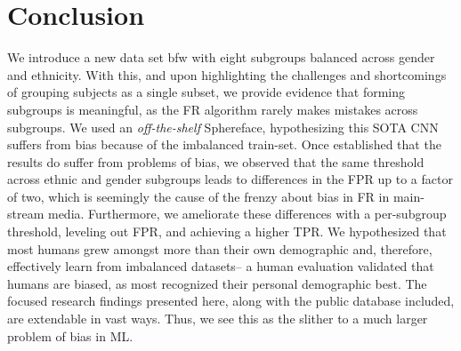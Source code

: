 \documentclass[10pt,twocolumn,letterpaper]{article}
\begin{document}
\section{Conclusion}
We introduce a new data set \gls{bfw} with eight subgroups balanced across gender and ethnicity. With this, and upon highlighting the challenges and shortcomings of grouping subjects as a single subset, we provide evidence that forming subgroups is meaningful, as the FR algorithm rarely makes mistakes across subgroups. We used an \textit{off-the-shelf} Sphereface, hypothesizing this SOTA CNN suffers from bias because of the imbalanced train-set. Once established that the results do suffer from problems of bias, we observed that the same threshold across ethnic and gender subgroups leads to differences in the FPR up to a factor of two, which is seemingly the cause of the frenzy about bias in FR in main-stream media. Furthermore, we ameliorate these differences with a per-subgroup threshold, leveling out FPR, and achieving a higher TPR. We hypothesized that most humans grew amongst more than their own demographic and, therefore, effectively learn from imbalanced datasets-- a human evaluation validated that humans are biased, as most recognized their personal demographic best. The focused research findings presented here, along with the public database included, are extendable in vast ways. Thus, we see this as the slither to a much larger problem of bias in ML.



{\small


}


\end{document}
